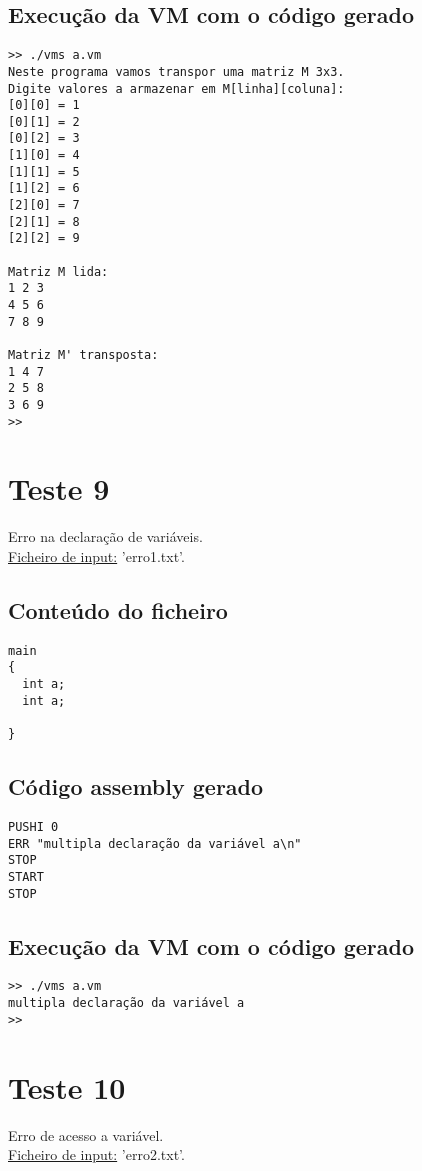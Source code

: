 \documentclass[11pt,a4paper]{report}%
\begin{document}
\subsection{Execução da VM com o código gerado}

\begin{verbatim}
>> ./vms a.vm
Neste programa vamos transpor uma matriz M 3x3.
Digite valores a armazenar em M[linha][coluna]:
[0][0] = 1
[0][1] = 2
[0][2] = 3
[1][0] = 4
[1][1] = 5
[1][2] = 6
[2][0] = 7
[2][1] = 8
[2][2] = 9

Matriz M lida:
1 2 3 
4 5 6 
7 8 9 

Matriz M' transposta:
1 4 7 
2 5 8 
3 6 9 
>>
\end{verbatim}



\section{Teste 9}
Erro na declaração de variáveis. \\
\underline{Ficheiro de input:} 'erro1.txt'.

\subsection{Conteúdo do ficheiro}

\begin{verbatim}
main
{
  int a;
  int a;

}
\end{verbatim}


\subsection{Código assembly gerado}
\begin{verbatim}
PUSHI 0
ERR "multipla declaração da variável a\n"
STOP
START
STOP
\end{verbatim}


\subsection{Execução da VM com o código gerado}

\begin{verbatim}
>> ./vms a.vm
multipla declaração da variável a
>>
\end{verbatim}

\section{Teste 10}
Erro de acesso a variável. \\
\underline{Ficheiro de input:} 'erro2.txt'.
\end{document}
